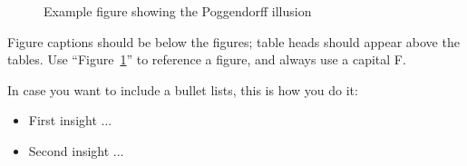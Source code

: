 \documentclass[conference]{IEEEtran}
\begin{document}
\begin{figure}[tb]






\caption{Example figure showing the Poggendorff illusion}
\label{figlabel}
\end{figure}



Figure captions should be
below the figures; table heads should appear above the tables.
Use
``Figure~\ref{figlabel}'' to reference a figure, and always use a capital F.


In case you want to include a bullet lists, this is how you do it:
\begin{itemize}
\item First insight ...
\item Second insight ...
\end{itemize}
\end{document}
